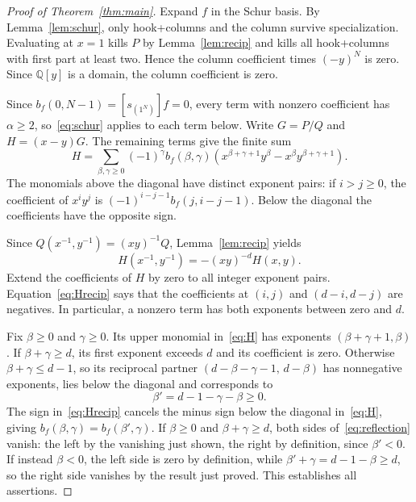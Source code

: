 \documentclass[11pt]{article}
\newcommand{\Q}{\mathbb{Q}}
\begin{document}
\begin{proof}[Proof of Theorem~\ref{thm:main}]
Expand $f$ in the Schur basis. By Lemma~\ref{lem:schur}, only hook+columns and the column survive specialization. Evaluating at $x=1$ kills $P$ by Lemma~\ref{lem:recip} and kills all hook+columns with first part at least two. Hence the column coefficient times $(-y)^N$ is zero. Since $\Q[y]$ is a domain, the column coefficient is zero.

Since $b_f(0,N-1)=[s_{(1^N)}]f=0$, every term with nonzero coefficient has $\alpha\geq2$, so~\eqref{eq:schur} applies to each term below. Write $G=P/Q$ and $H=(x-y)G$. The remaining terms give the finite sum
\begin{equation}\label{eq:H}
 H=\sum_{\beta,\gamma\geq0}(-1)^\gamma b_f(\beta,\gamma)
 \left(x^{\beta+\gamma+1}y^\beta-x^\beta y^{\beta+\gamma+1}\right).
\end{equation}
The monomials above the diagonal have distinct exponent pairs: if $i>j\geq0$, the coefficient of $x^iy^j$ is $(-1)^{i-j-1}b_f(j,i-j-1)$. Below the diagonal the coefficients have the opposite sign.

Since $Q(x^{-1},y^{-1})=(xy)^{-1}Q$, Lemma~\ref{lem:recip} yields
\begin{equation}\label{eq:Hrecip}
 H(x^{-1},y^{-1})=-(xy)^{-d}H(x,y).
\end{equation}
Extend the coefficients of $H$ by zero to all integer exponent pairs. Equation~\eqref{eq:Hrecip} says that the coefficients at $(i,j)$ and $(d-i,d-j)$ are negatives. In particular, a nonzero term has both exponents between zero and $d$.

Fix $\beta\geq0$ and $\gamma\geq0$. Its upper monomial in~\eqref{eq:H} has exponents $(\beta+\gamma+1,\beta)$. If $\beta+\gamma\geq d$, its first exponent exceeds $d$ and its coefficient is zero. Otherwise $\beta+\gamma\leq d-1$, so its reciprocal partner $(d-\beta-\gamma-1,\,d-\beta)$ has nonnegative exponents, lies below the diagonal and corresponds to
\[
 \beta'=d-1-\gamma-\beta\geq0.
\]
The sign in~\eqref{eq:Hrecip} cancels the minus sign below the diagonal in~\eqref{eq:H}, giving $b_f(\beta,\gamma)=b_f(\beta',\gamma)$. If $\beta\geq0$ and $\beta+\gamma\geq d$, both sides of~\eqref{eq:reflection} vanish: the left by the vanishing just shown, the right by definition, since $\beta'<0$. If instead $\beta<0$, the left side is zero by definition, while $\beta'+\gamma=d-1-\beta\geq d$, so the right side vanishes by the result just proved. This establishes all assertions.
\end{proof}
\end{document}
